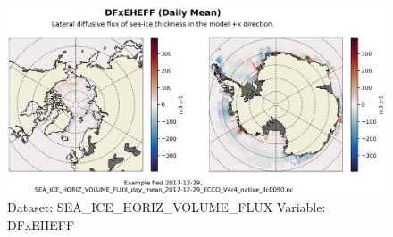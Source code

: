 \begin{figure}[H]
\centering
\includegraphics[scale=0.55]{../images/plots/native_plots/Sea-Ice_and_Snow_Horizontal_Volume_Fluxes/DFxEHEFF.png}
\caption{Dataset: SEA\_ICE\_HORIZ\_VOLUME\_FLUX Variable: DFxEHEFF}
\label{tab:table-SEA_ICE_HORIZ_VOLUME_FLUX_DFxEHEFF-Plot}
\end{figure}
\pagebreak

